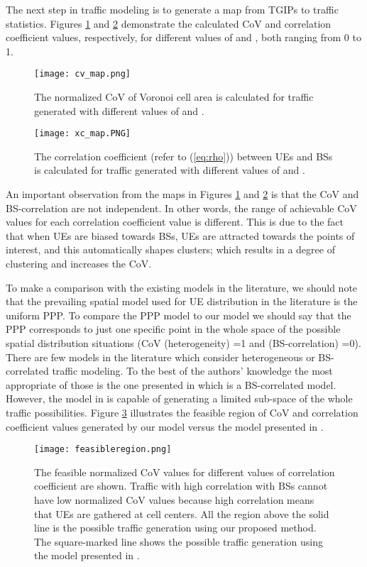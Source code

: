 \documentclass[journal]{IEEEtran}
\begin{document}
The next step in traffic modeling is to generate a map from TGIPs to traffic statistics. Figures \ref{fig:cv_map} and \ref{fig:xc_map} demonstrate the calculated CoV and correlation coefficient values, respectively, for different values of  and , both ranging from 0 to 1.

\begin{figure}
\centering
\texttt{[image: cv\_map.png]}
\caption{The normalized CoV of Voronoi cell area is calculated for traffic generated with different values of  and .}
\label{fig:cv_map}
\end{figure}

\begin{figure}
\centering
\texttt{[image: xc\_map.PNG]}
\caption{The correlation coefficient (refer to (\ref{eq:rho})) between UEs and BSs is calculated for traffic generated with different values of  and .}
\label{fig:xc_map}
\end{figure}

An important observation from the maps in Figures \ref{fig:cv_map} and \ref{fig:xc_map} is that the CoV and BS-correlation are not independent. In other words, the range of achievable CoV values for each correlation coefficient value is different. This is due to the fact that when UEs are biased towards BSs, UEs are attracted towards the points of interest, and this automatically shapes clusters; which results in a degree of clustering and increases the CoV.

To make a comparison with the existing models in the literature, we should note that the prevailing spatial model used for UE distribution in the literature is the uniform PPP. To compare the PPP model to our model we should say that the PPP corresponds to just one specific point in the whole space of the possible spatial distribution situations (CoV (heterogeneity) =1 and  (BS-correlation) =0). There are few models in the literature which consider heterogeneous or BS-correlated traffic modeling. To the best of the authors' knowledge the most appropriate of those is the one presented in \cite{dhillon2012modeling1} which is a BS-correlated model. However, the model in \cite{dhillon2012modeling1} is capable of generating a limited sub-space of the whole traffic possibilities. Figure \ref{fig:feasibleregion} illustrates the feasible region of CoV and correlation coefficient values generated by our model versus the model presented in \cite{dhillon2012modeling1}.

\begin{figure}
\centering
\texttt{[image: feasibleregion.png]}
\caption{The feasible normalized CoV values for different values of correlation coefficient are shown. Traffic with high correlation with BSs cannot have low normalized CoV values because high correlation means that UEs are gathered at cell centers. All the region above the solid line is the possible traffic generation using our proposed method. The square-marked line shows the possible traffic generation using the model presented in \cite{dhillon2012modeling1}.}
\label{fig:feasibleregion}
\end{figure}
\end{document}

